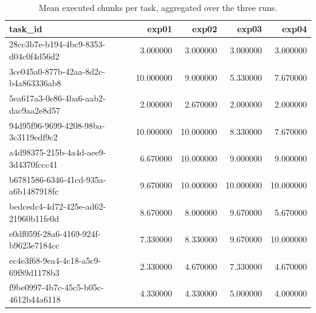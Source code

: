 \begin{table}
\caption{Mean executed chunks per task, aggregated over the three runs.}
\label{tab:task_chunks_by_exp}
\begin{tabular}{lrrrr}
\toprule
task\_id & exp01 & exp02 & exp03 & exp04 \\
\midrule
28cc3b7e-b194-4bc9-8353-d04c0f4d56d2 & 3.000000 & 3.000000 & 3.000000 & 3.000000 \\
3ce045a0-877b-42aa-8d2c-b4a863336ab8 & 10.000000 & 9.000000 & 5.330000 & 7.670000 \\
5ea617a3-0e86-4ba6-aab2-dac9aa2e8d57 & 2.000000 & 2.670000 & 2.000000 & 2.000000 \\
94d95f96-9699-4208-98ba-3c3119edf9c2 & 10.000000 & 10.000000 & 8.330000 & 7.670000 \\
a4d98375-215b-4a4d-aee9-3d4370fccc41 & 6.670000 & 10.000000 & 9.000000 & 9.000000 \\
b6781586-6346-41cd-935a-a6b1487918fc & 9.670000 & 10.000000 & 10.000000 & 10.000000 \\
bedcedc4-4d72-425e-ad62-21960b11fe0d & 8.670000 & 8.000000 & 9.670000 & 5.670000 \\
e0df059f-28a6-4169-924f-b9623e7184cc & 7.330000 & 8.330000 & 9.670000 & 10.000000 \\
ec4e3f68-9ea4-4c18-a5c9-69f89d1178b3 & 2.330000 & 4.670000 & 7.330000 & 4.670000 \\
f9be0997-4b7c-45c5-b05c-4612b44a6118 & 4.330000 & 4.330000 & 5.000000 & 4.000000 \\
\bottomrule
\end{tabular}
\end{table}


